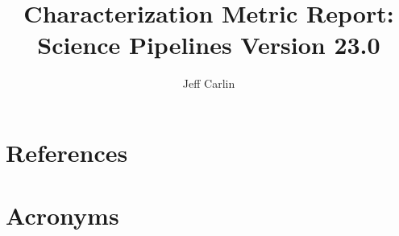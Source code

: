 \documentclass[OPS,toc]{lsstdoc}
\title{Characterization Metric Report: Science Pipelines Version 23.0}
\author{%
Jeff Carlin
}
\date{\vcsDate}
\begin{document}
\maketitle


\appendix

\section{References} \label{sec:bib}
\renewcommand{\refname}{} %


\section{Acronyms} \label{sec:acronyms}

\end{document}
